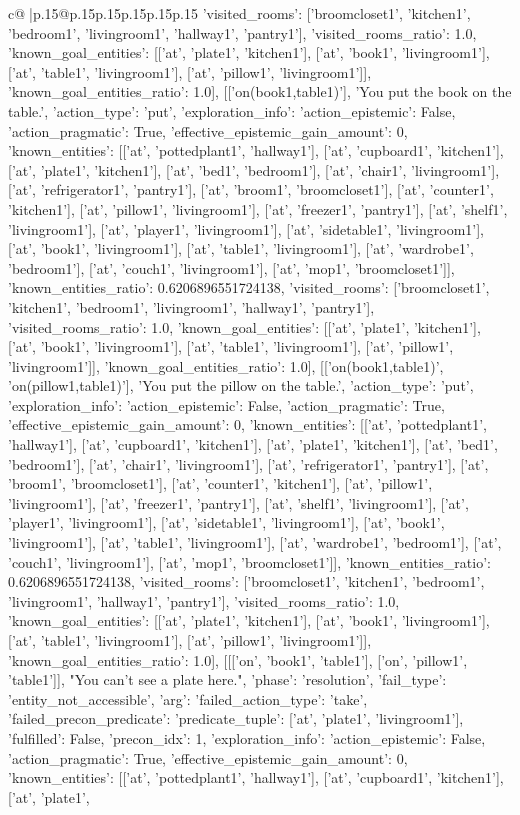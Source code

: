 \documentclass{article}
\begin{document}
{\begin{supertabular}{c@{$\;$}|p{.15\linewidth}@{}p{.15\linewidth}p{.15\linewidth}p{.15\linewidth}p{.15\linewidth}p{.15\linewidth}}
{{{'visited_rooms': ['broomcloset1', 'kitchen1', 'bedroom1', 'livingroom1', 'hallway1', 'pantry1'], 'visited_rooms_ratio': 1.0, 'known_goal_entities': [['at', 'plate1', 'kitchen1'], ['at', 'book1', 'livingroom1'], ['at', 'table1', 'livingroom1'], ['at', 'pillow1', 'livingroom1']], 'known_goal_entities_ratio': 1.0}}], [['on(book1,table1)'], 'You put the book on the table.', {'action_type': 'put', 'exploration_info': {'action_epistemic': False, 'action_pragmatic': True, 'effective_epistemic_gain_amount': 0, 'known_entities': [['at', 'pottedplant1', 'hallway1'], ['at', 'cupboard1', 'kitchen1'], ['at', 'plate1', 'kitchen1'], ['at', 'bed1', 'bedroom1'], ['at', 'chair1', 'livingroom1'], ['at', 'refrigerator1', 'pantry1'], ['at', 'broom1', 'broomcloset1'], ['at', 'counter1', 'kitchen1'], ['at', 'pillow1', 'livingroom1'], ['at', 'freezer1', 'pantry1'], ['at', 'shelf1', 'livingroom1'], ['at', 'player1', 'livingroom1'], ['at', 'sidetable1', 'livingroom1'], ['at', 'book1', 'livingroom1'], ['at', 'table1', 'livingroom1'], ['at', 'wardrobe1', 'bedroom1'], ['at', 'couch1', 'livingroom1'], ['at', 'mop1', 'broomcloset1']], 'known_entities_ratio': 0.6206896551724138, 'visited_rooms': ['broomcloset1', 'kitchen1', 'bedroom1', 'livingroom1', 'hallway1', 'pantry1'], 'visited_rooms_ratio': 1.0, 'known_goal_entities': [['at', 'plate1', 'kitchen1'], ['at', 'book1', 'livingroom1'], ['at', 'table1', 'livingroom1'], ['at', 'pillow1', 'livingroom1']], 'known_goal_entities_ratio': 1.0}}], [['on(book1,table1)', 'on(pillow1,table1)'], 'You put the pillow on the table.', {'action_type': 'put', 'exploration_info': {'action_epistemic': False, 'action_pragmatic': True, 'effective_epistemic_gain_amount': 0, 'known_entities': [['at', 'pottedplant1', 'hallway1'], ['at', 'cupboard1', 'kitchen1'], ['at', 'plate1', 'kitchen1'], ['at', 'bed1', 'bedroom1'], ['at', 'chair1', 'livingroom1'], ['at', 'refrigerator1', 'pantry1'], ['at', 'broom1', 'broomcloset1'], ['at', 'counter1', 'kitchen1'], ['at', 'pillow1', 'livingroom1'], ['at', 'freezer1', 'pantry1'], ['at', 'shelf1', 'livingroom1'], ['at', 'player1', 'livingroom1'], ['at', 'sidetable1', 'livingroom1'], ['at', 'book1', 'livingroom1'], ['at', 'table1', 'livingroom1'], ['at', 'wardrobe1', 'bedroom1'], ['at', 'couch1', 'livingroom1'], ['at', 'mop1', 'broomcloset1']], 'known_entities_ratio': 0.6206896551724138, 'visited_rooms': ['broomcloset1', 'kitchen1', 'bedroom1', 'livingroom1', 'hallway1', 'pantry1'], 'visited_rooms_ratio': 1.0, 'known_goal_entities': [['at', 'plate1', 'kitchen1'], ['at', 'book1', 'livingroom1'], ['at', 'table1', 'livingroom1'], ['at', 'pillow1', 'livingroom1']], 'known_goal_entities_ratio': 1.0}}], [[['on', 'book1', 'table1'], ['on', 'pillow1', 'table1']], "You can't see a plate here.", {'phase': 'resolution', 'fail_type': 'entity_not_accessible', 'arg': {'failed_action_type': 'take', 'failed_precon_predicate': {'predicate_tuple': ['at', 'plate1', 'livingroom1'], 'fulfilled': False, 'precon_idx': 1}}, 'exploration_info': {'action_epistemic': False, 'action_pragmatic': True, 'effective_epistemic_gain_amount': 0, 'known_entities': [['at', 'pottedplant1', 'hallway1'], ['at', 'cupboard1', 'kitchen1'], ['at', 'plate1', }}}
\end{supertabular}}
\end{document}

